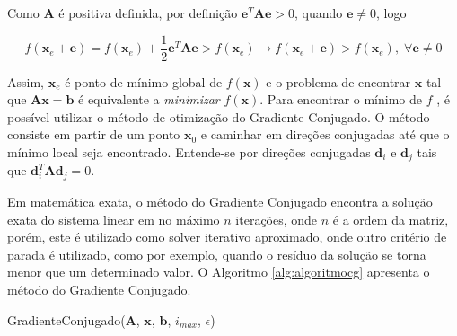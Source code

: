Como $\mathbf{A}$ é positiva definida, por definição $\mathbf{e}^T\mathbf{A}\mathbf{e}  > 0$, quando $\mathbf{e}\neq0$, logo

\begin{equation}
    f(\mathbf{x}_e + \mathbf{e}) = f(\mathbf{x}_e) + \frac{1}{2}  \mathbf{e}^T\mathbf{A}\mathbf{e} > f(\mathbf{x}_e)\rightarrow  f(\mathbf{x}_e + \mathbf{e}) > f(\mathbf{x}_e),\; \forall \mathbf{e} \neq 0
\end{equation}


Assim, $\mathbf{x}_e$ é ponto de mínimo global de $f(\mathbf{x})$ e o problema de encontrar $\mathbf{x}$ tal que $\mathbf{A}\mathbf{x} = \mathbf{b}$ é equivalente a \textit{minimizar} $f(\mathbf{x})$. Para encontrar o mínimo de $f$ , é possível utilizar o método de otimização do Gradiente Conjugado. O método consiste em partir de um ponto $\mathbf{x}_0$ e caminhar em direções conjugadas até que o mínimo local seja encontrado. Entende-se por direções conjugadas $\mathbf{d}_i$ e $\mathbf{d}_j$ tais que $\mathbf{d}_i^T\mathbf{A}\mathbf{d}_j=0$. 

Em matemática exata, o método do Gradiente Conjugado encontra a solução exata do sistema linear em no máximo $n$ iterações, onde $n$ é a ordem da matriz, porém, este é utilizado como solver iterativo aproximado, onde outro critério de parada é utilizado, como por exemplo, quando o resíduo  da solução se torna menor que um determinado valor. O Algoritmo \ref{alg:algoritmocg} apresenta o método do Gradiente Conjugado. 


\vspace{1cm}
\begin{algorithm}[H]
\caption{GradienteConjugado($\mathbf{A}$, $\mathbf{x}$, $\mathbf{b}$, $i_{max}$, $\epsilon$)}
\label{alg:algoritmocg}
\end{algorithm}
\vspace{1cm}


